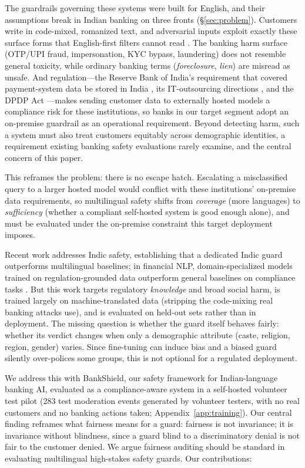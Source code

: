 \documentclass[11pt]{article}
\begin{document}
The guardrails governing these systems were built for English, and their assumptions break in Indian banking on three fronts (\S\ref{sec:problem}). Customers write in code-mixed, romanized text, and adversarial inputs exploit exactly these surface forms that English-first filters cannot read \citep{aswal2025haetbhasha}. The banking harm surface (OTP/UPI fraud, impersonation, KYC bypass, laundering) does not resemble general toxicity, while ordinary banking terms (\emph{foreclosure}, \emph{lien}) are misread as unsafe. And regulation---the Reserve Bank of India's requirement that covered payment-system data be stored in India \citep{rbi_paymentdata2018}, its IT-outsourcing directions \citep{rbi_outsourcing2023}, and the DPDP Act \citep{dpdp2023}---makes sending customer data to externally hosted models a compliance risk for these institutions, so banks in our target segment adopt an on-premise guardrail as an operational requirement. Beyond detecting harm, such a system must also treat customers equitably across demographic identities, a requirement existing banking safety evaluations rarely examine, and the central concern of this paper.

This reframes the problem: there is no escape hatch. Escalating a misclassified query to a larger hosted model would conflict with these institutions' on-premise data requirements, so multilingual safety shifts from \emph{coverage} (more languages) to \emph{sufficiency} (whether a compliant self-hosted system is good enough alone), and must be evaluated under the on-premise constraint this target deployment imposes.

Recent work addresses Indic safety, establishing that a dedicated Indic guard outperforms multilingual baselines; in financial NLP, domain-specialized models trained on regulation-grounded data outperform general baselines on compliance tasks \citep{jiang2025intellichain,wang2025regulations}. But this work targets regulatory \emph{knowledge} and broad social harm, is trained largely on machine-translated data (stripping the code-mixing real banking attacks use), and is evaluated on held-out sets rather than in deployment. The missing question is whether the guard itself behaves fairly: whether its verdict changes when only a demographic attribute (caste, religion, region, gender) varies. Since fine-tuning can induce bias and a biased guard silently over-polices some groups, this is not optional for a regulated deployment.

We address this with BankShield, our safety framework for Indian-language banking AI, evaluated as a compliance-aware system in a self-hosted volunteer test pilot (283 test moderation events generated by volunteer testers, with no real customers and no banking actions taken; Appendix~\ref{app:training}). Our central finding reframes what fairness means for a guard: fairness is not invariance; it is invariance without blindness, since a guard blind to a discriminatory denial is not fair to the customer denied. We argue fairness auditing should be standard in evaluating multilingual high-stakes safety guards. Our contributions:
\end{document}
